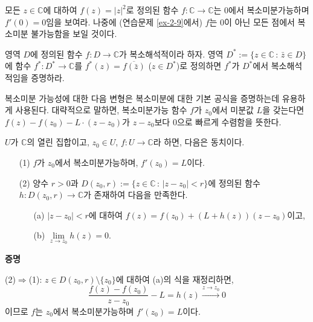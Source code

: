 \begin{salt_exercise} \label{ex-2-1}
모든 $z\in\mathbb C$에 대하여 $f(z) = |z|^2$로 정의된
함수 $f:\mathbb C \to \mathbb C$는 $0$에서 복소미분가능하며
$f'(0)=0$임을 보여라.
나중에 (연습문제 \ref{ex-2-9}에서) $f$는 $0$이 아닌 모든 점에서 복소미분 불가능함을 보일 것이다.
\end{salt_exercise}

\begin{salt_exercise} \label{ex-2-2}
영역 $D$에 정의된 함수 $f:D\to \mathbb C$가 복소해석적이라 하자.
영역 $D^* := \{ z\in \mathbb C \,:\, \bar z \in D\}$에 
함수 $f^*:D^* \to \mathbb C$를 $f^*(z) = \overline{f(\bar  z)}$ ($z\in D^*$)로
정의하면 $f^*$가  $D^*$에서 복소해석적임을 증명하라.
\end{salt_exercise}

복소미분 가능성에 대한 다음 변형은 복소미분에 대한 기본 공식을 증명하는데 유용하게 사용된다.
대략적으로 말하면, 복소미분가능 함수 $f$가 $z_0$에서 미분값 $L$을 갖는다면
$f(z)-f(z_0) - L\cdot (z-z_0)$가 $z-z_0$보다 $0$으로 빠르게 수렴함을 뜻한다.

\begin{salt_lemma} \label{lemma-2-1}
$U$가 $\mathbb C$의 열린 집합이고, $z_0\in U$, $f:U\to\mathbb C$라 하면,
다음은 동치이다.
\begin{itemize}
\item[(1)] $f$가 $z_0$에서 복소미분가능하며, $f'(z_0)=L$이다.
\item[(2)] 양수 $r>0$과  $D(z_0,r):=\{z\in\mathbb C\,:\, |z-z_0|<r\}$에 정의된
함수  $h:D(z_0,r)\to \mathbb C$가 존재하여 다음을 만족한다.
\begin{itemize}
\item[(a)] $|z-z_0|<r$에 대하여 $f(z)=f(z_0) + (L+h(z))(z-z_0)$이고,
\item[(b)] $\lim\limits_{z\to z_0} h(z)=0$.
\end{itemize}
\end{itemize}
\end{salt_lemma}

{\bf 증명}

(2)$\Rightarrow$(1):
$z\in D(z_0,r)\setminus \{z_0\}$에 대하여 (a)의 식을 재정리하면,
\[
\dfrac{f(z) - f(z_0)}{z - z_0} - L = h(z) \xrightarrow{z\to z_0} 0
\]
이므로 $f$는 $z_0$에서 복소미분가능하며 $f'(z_0)=L$이다.

